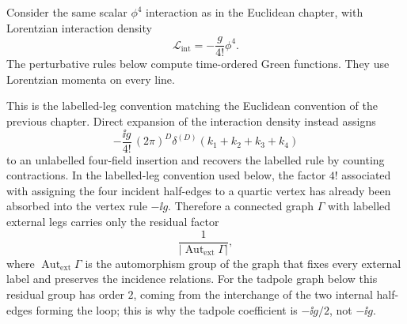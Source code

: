 \begin{definition}
\label{def:lorentzian-labelled-graph-rules-green-functions}
Consider the same scalar \(\phi^4\) interaction as in the Euclidean chapter,
with Lorentzian interaction density
\[
  \mathcal L_{\mathrm{int}}
  =
  -\frac{g}{4!}\phi^4 .
\]
The perturbative rules below compute time-ordered Green functions. They use
Lorentzian momenta on every line.

\begin{center}
\end{center}

This is the labelled-leg convention matching the Euclidean convention of the
previous chapter. Direct expansion of the interaction density instead assigns
\[
  -\frac{\ii g}{4!}\,(2\pi)^D
  \delta^{(D)}(k_1+k_2+k_3+k_4)
\]
to an unlabelled four-field insertion and recovers the labelled rule by
counting contractions.
In the labelled-leg convention used below, the factor \(4!\) associated with
assigning the four incident half-edges to a quartic vertex has already been
absorbed into the vertex rule \(-\ii g\).  Therefore a connected graph
\(\Gamma\) with labelled external legs carries only the residual factor
\[
  \frac{1}{|\operatorname{Aut}_{\mathrm{ext}}\Gamma|},
\]
where \(\operatorname{Aut}_{\mathrm{ext}}\Gamma\) is the automorphism group of
the graph that fixes every external label and preserves the incidence
relations.  For the tadpole graph below this residual group has order \(2\),
coming from the interchange of the two internal half-edges forming the loop;
this is why the tadpole coefficient is \(-\ii g/2\), not \(-\ii g\).
\end{definition}


